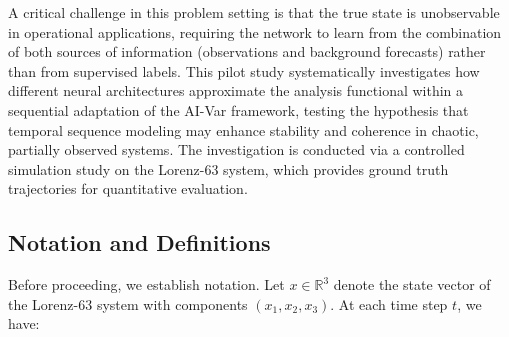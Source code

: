 \documentclass[12pt,a4paper]{article}
\begin{document}
\noindent
A critical challenge in this problem setting is that the true state is unobservable in operational applications, requiring the network to learn from the combination of both sources of information (observations and background forecasts) rather than from supervised labels. This pilot study systematically investigates how different neural architectures approximate the analysis functional within a sequential adaptation of the AI-Var framework, testing the hypothesis that temporal sequence modeling may enhance stability and coherence in chaotic, partially observed systems. The investigation is conducted via a controlled simulation study on the Lorenz-63 system, which provides ground truth trajectories for quantitative evaluation.

\subsection{Notation and Definitions}
\label{sec:notation}

\noindent
Before proceeding, we establish notation. Let $x \in \mathbb{R}^3$ denote the state vector of the Lorenz-63 system with components $(x_1, x_2, x_3)$. At each time step $t$, we have:
\end{document}
